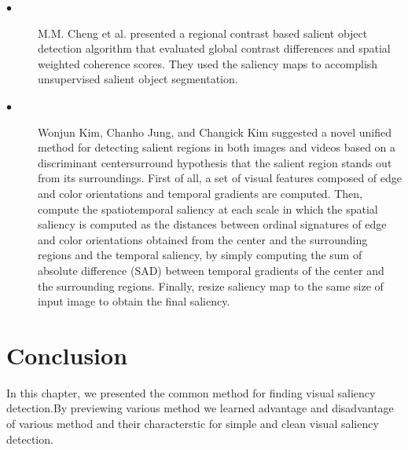 \begin{description}
\item[$\bullet$] M.M. Cheng et al. \cite{cheng2015global}  presented a regional contrast
based salient object detection algorithm that evaluated global contrast differences and spatial
weighted coherence scores. They used the saliency maps to accomplish unsupervised salient
object segmentation.



\item[$\bullet$] Wonjun Kim, Chanho Jung, and Changick Kim \cite{kim2011spatiotemporal} 
suggested a novel unified method for detecting salient regions
in both images and videos based on a discriminant centersurround hypothesis that the salient region stands out from its
surroundings. First of all, a set of visual features composed of
edge and color orientations and temporal gradients are
computed. Then, compute the spatiotemporal saliency at each
scale in which the spatial saliency is computed as the
distances between ordinal signatures of edge and color
orientations obtained from the center and the surrounding
regions and the temporal saliency, by simply computing the
sum of absolute difference (SAD) between temporal gradients
of the center and the surrounding regions. Finally, resize
saliency map to the same size of input image to obtain the
final saliency.


\end{description}

\section{Conclusion}
In this chapter, we presented the common method for finding visual saliency detection.By previewing various method we learned advantage and disadvantage of various method and their characterstic
for simple and clean visual saliency detection.